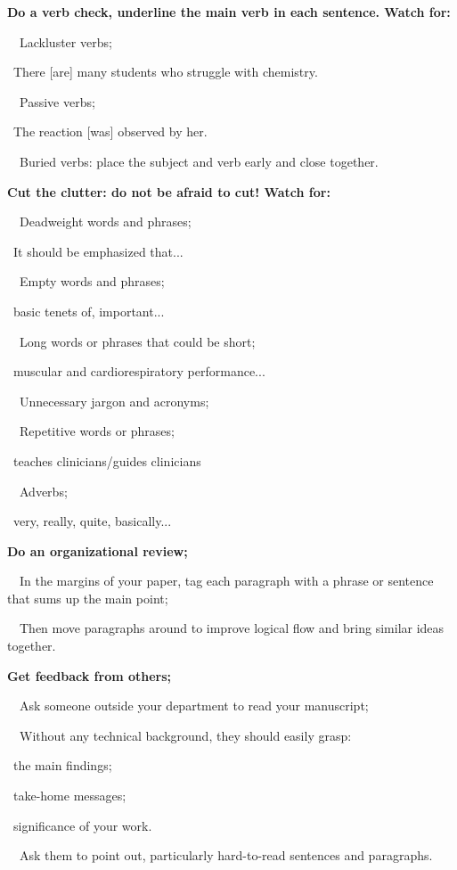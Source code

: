 \documentclass[a4paper, 12pt]{article}
\begin{document}
\textbf{Do a verb check, underline the main verb in each sentence. Watch for:}
\par\ \textbullet\ Lackluster verbs;
\par\quad\textopenbullet\ There [are] many students who struggle with chemistry.
\par\ \textbullet\ Passive verbs;
\par\quad\textopenbullet\ The reaction [was] observed by her.
\par\ \textbullet\ Buried verbs: place the subject and verb early and close together.

\textbf{Cut the clutter: do not be afraid to cut! Watch for:}
\par\ \textbullet\ Deadweight words and phrases;
\par\quad\textopenbullet\ It should be emphasized that...
\par\ \textbullet\ Empty words and phrases;
\par\quad\textopenbullet\ basic tenets of, important...
\par\ \textbullet\ Long words or phrases that could be short;
\par\quad\textopenbullet\ muscular and cardiorespiratory performance...
\par\ \textbullet\ Unnecessary jargon and acronyms;
\par\ \textbullet\ Repetitive words or phrases;
\par\quad\textopenbullet\ teaches clinicians/guides clinicians
\par\ \textbullet\ Adverbs;
\par\quad\textopenbullet\ very, really, quite, basically...

\newpage\textbf{Do an organizational review;}
\par\ \textbullet\ In the margins of your paper, tag each paragraph with a phrase or sentence that sums up the main point;
\par\ \textbullet\ Then move paragraphs around to improve logical flow and bring similar ideas together.

\textbf{Get feedback from others;}
\par\ \textbullet\ Ask someone outside your department to read your manuscript;
\par\ \textbullet\ Without any technical background, they should easily grasp:
\par\quad\textopenbullet\ the main findings;
\par\quad\textopenbullet\ take-home messages;
\par\quad\textopenbullet\ significance of your work.
\par\ \textbullet\ Ask them to point out, particularly hard-to-read sentences and paragraphs.
\end{document}
